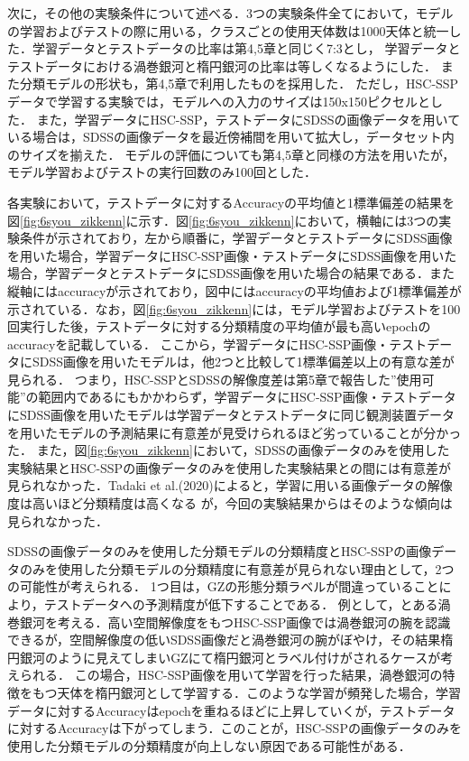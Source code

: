 \documentclass[a4j, 11pt]{jreport}
\begin{document}
次に，その他の実験条件について述べる．3つの実験条件全てにおいて，モデルの学習およびテストの際に用いる，クラスごとの使用天体数は1000天体と統一した．学習データとテストデータの比率は第4,5章と同じく7:3とし，
学習データとテストデータにおける渦巻銀河と楕円銀河の比率は等しくなるようにした．
また分類モデルの形状も，第4,5章で利用したものを採用した．
ただし，HSC-SSPデータで学習する実験では，モデルへの入力のサイズは150x150ピクセルとした．
また，学習データにHSC-SSP，テストデータにSDSSの画像データを用いている場合は，SDSSの画像データを最近傍補間を用いて拡大し，データセット内のサイズを揃えた．
モデルの評価についても第4,5章と同様の方法を用いたが，モデル学習およびテストの実行回数のみ100回とした．

各実験において，テストデータに対するAccuracyの平均値と1標準偏差の結果を図\ref{fig:6syou_zikkenn}に示す．図\ref{fig:6syou_zikkenn}において，横軸には3つの実験条件が示されており，左から順番に，学習データとテストデータにSDSS画像を用いた場合，学習データにHSC-SSP画像・テストデータにSDSS画像を用いた場合，学習データとテストデータにSDSS画像を用いた場合の結果である．また縦軸にはaccuracyが示されており，図中にはaccuracyの平均値および1標準偏差が示されている．なお，図\ref{fig:6syou_zikkenn}には，モデル学習およびテストを100回実行した後，テストデータに対する分類精度の平均値が最も高いepochのaccuracyを記載している．
ここから，学習データにHSC-SSP画像・テストデータにSDSS画像を用いたモデルは，他2つと比較して1標準偏差以上の有意な差が見られる．
つまり，HSC-SSPとSDSSの解像度差は第5章で報告した''使用可能''の範囲内であるにもかかわらず，学習データにHSC-SSP画像・テストデータにSDSS画像を用いたモデルは学習データとテストデータに同じ観測装置データを用いたモデルの予測結果に有意差が見受けられるほど劣っていることが分かった．
また，図\ref{fig:6syou_zikkenn}において，SDSSの画像データのみを使用した実験結果とHSC-SSPの画像データのみを使用した実験結果との間には有意差が見られなかった．Tadaki et al.(2020)によると，学習に用いる画像データの解像度は高いほど分類精度は高くなる
が，今回の実験結果からはそのような傾向は見られなかった．

SDSSの画像データのみを使用した分類モデルの分類精度とHSC-SSPの画像データのみを使用した分類モデルの分類精度に有意差が見られない理由として，2つの可能性が考えられる．
1つ目は，GZの形態分類ラベルが間違っていることにより，テストデータへの予測精度が低下することである．
例として，とある渦巻銀河を考える．高い空間解像度をもつHSC-SSP画像では渦巻銀河の腕を認識できるが，空間解像度の低いSDSS画像だと渦巻銀河の腕がぼやけ，その結果楕円銀河のように見えてしまいGZにて楕円銀河とラベル付けがされるケースが考えられる．
この場合，HSC-SSP画像を用いて学習を行った結果，渦巻銀河の特徴をもつ天体を楕円銀河として学習する．このような学習が頻発した場合，学習データに対するAccuracyはepochを重ねるほどに上昇していくが，テストデータに対するAccuracyは下がってしまう．このことが，HSC-SSPの画像データのみを使用した分類モデルの分類精度が向上しない原因である可能性がある．
\end{document}
